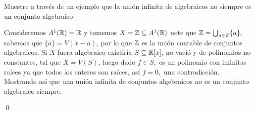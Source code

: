 \newpage
\begin{homeworkProblem}
    Muestre a través de un ejemplo que la unión infinita de algebraicos no siempre es un conjunto algebraico
    \begin{solucion}
        Consideremos $A^1(\mathbb{R})=\mathbb{R}$ y tomemos $X= \mathbb{Z} \subseteq A^1(\mathbb{R})$ note que $\mathbb{Z}=\bigcup_{a\in Z}\{a\},$ sabemos que $\{a\}=V(x-a)$, por lo que $\mathbb{Z}$ es la unión contable de conjuntos algebraicos. Si $X$ fuera algebraico existiría $S\subseteq \mathbb{R}[x]$, no vació y de polinomios no constantes, tal que $X=V(S)$, luego dado $f\in S,$ es un polinomio con infinitas raíces ya que todos los enteros son raíces, así $f=0,$ una contradicción. Mostrando así que una unión infinita de conjuntos algebraicos no es un conjunto algebraico siempre.

        \qed
    \end{solucion}
\end{homeworkProblem}

